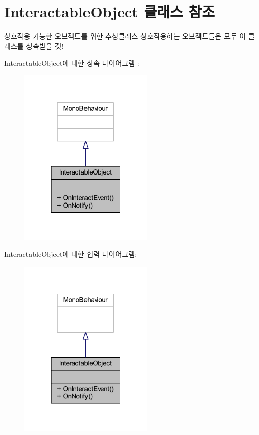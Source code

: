 \hypertarget{class_interactable_object}{}\section{Interactable\+Object 클래스 참조}
\label{class_interactable_object}


상호작용 가능한 오브젝트를 위한 추상클래스 상호작용하는 오브젝트들은 모두 이 클래스를 상속받을 것!  




Interactable\+Object에 대한 상속 다이어그램 \+: \nopagebreak
\begin{figure}[H]
\begin{center}
\leavevmode
\includegraphics[width=181pt]{d1/d32/class_interactable_object__inherit__graph}
\end{center}
\end{figure}


Interactable\+Object에 대한 협력 다이어그램\+:\nopagebreak
\begin{figure}[H]
\begin{center}
\leavevmode
\includegraphics[width=181pt]{de/d00/class_interactable_object__coll__graph}
\end{center}
\end{figure}
